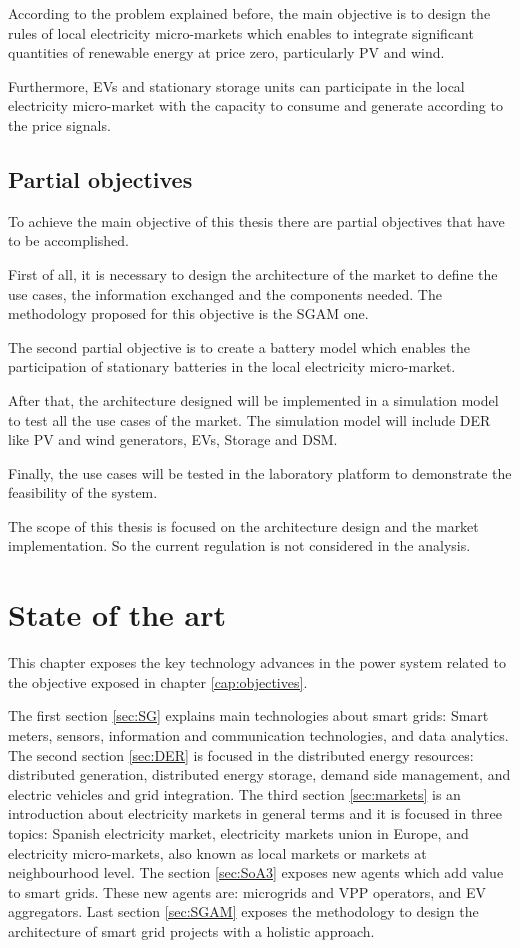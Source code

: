 \documentclass[a4paper,11pt,twoside,openright]{report}
\begin{document}
According to the problem explained before, the main objective is to design the rules of local electricity micro-markets which enables to integrate significant quantities of renewable energy at price zero, particularly PV and wind. 

Furthermore, EVs and stationary storage units can participate in the local electricity micro-market with the capacity to consume and generate according to the price signals. 

\section{Partial objectives}
To achieve the main objective of this thesis there are partial objectives that have to be accomplished.

First of all, it is necessary to design the architecture of the market to define the use cases, the information exchanged and the components needed. The methodology proposed for this objective is the SGAM one. 

The second partial objective is to create a battery model which enables the participation of stationary batteries in the local electricity micro-market.

After that, the architecture designed will be implemented in a simulation model to test all the use cases of the market. The simulation model will include DER like PV and wind generators, EVs, Storage and DSM.

Finally, the use cases will be tested in the laboratory platform to demonstrate the feasibility of the system.

The scope of this thesis is focused on the architecture design and the market implementation. So the current regulation is not considered in the analysis.

\chapter{State of the art}
\label{cap:state_of_the_art}
This chapter exposes the key technology advances in the power system related to the objective exposed in chapter \ref{cap:objectives}. 

The first section \ref{sec:SG} explains  main technologies about smart grids: Smart meters, sensors, information and communication technologies, and data analytics.
The second section \ref{sec:DER} is focused in the distributed energy resources: distributed generation, distributed energy storage, demand side management, and electric vehicles and grid integration.
The third section \ref{sec:markets} is an introduction about electricity markets in general terms and it is focused in three topics: Spanish electricity market, electricity markets union in Europe, and electricity micro-markets, also known as local markets or markets at neighbourhood level. 
The section \ref{sec:SoA3} exposes new agents which add value to smart grids. These new agents are: microgrids and VPP operators, and EV aggregators. 
Last section \ref{sec:SGAM} exposes the methodology to design the architecture of smart grid projects with a holistic approach.
\end{document}
